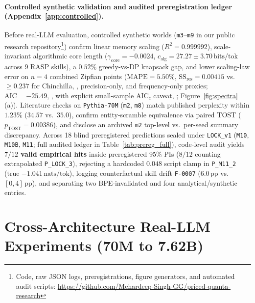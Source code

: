 \documentclass[10pt]{article} %
\begin{document}
\paragraph{Controlled synthetic validation and audited preregistration ledger (Appendix~\ref{app:controlled}).}
Before real-LLM evaluation, controlled synthetic worlds (\texttt{m3}--\texttt{m9} in our public research repository\footnote{Code, raw JSON logs, preregistrations, figure generators, and automated audit scripts: \url{https://github.com/Mehardeep-Singh-GG/priced-quanta-research}}) confirm linear memory scaling ($R^2 = 0.999992$), scale-invariant algorithmic core length ($\gamma_{\text{core}} = -0.0024$, $c_{\text{alg}} = 27.27 \pm 3.70\,\text{bits/tok}$ across 9 RASP skills), a $0.52\%$ greedy-vs-DP knapsack gap, and lower scaling-law error on $n=4$ combined Zipfian points ($\text{MAPE}=5.50\%$, $\text{SS}_{\text{res}} = 0.00415$ vs.\ $\ge 0.237$ for Chinchilla, \citealp{hoffmann2022chinchilla}, precision-only, and frequency-only proxies; $\text{AIC}=-25.49$, \citealp{akaike1974aic}, with explicit small-sample $\mathrm{AIC}_c$ caveat, \citealp{burnham2002aic}; Figure~\ref{fig:spectra}(a)). Literature checks on \texttt{Pythia-70M} (\texttt{m2}, \texttt{m8}) match published perplexity within $1.23\%$ ($34.57$ vs.\ $35.0$), confirm entity-scramble equivalence via paired TOST \citep{lakens2017tost} ($p_{\text{TOST}}=0.00386$), and disclose an archived \texttt{m2} top-level vs.\ per-seed summary discrepancy. Across 18 blind preregistered predictions sealed under \texttt{LOCK\_v1} (\texttt{M10}, \texttt{M10B}, \texttt{M11}; full audited ledger in Table~\ref{tab:prereg_full}), code-level audit yields \textbf{$7/12$ valid empirical hits} inside preregistered 95\% PIs ($8/12$ counting extrapolated \texttt{P\_LOCK\_3}), rejecting a hardcoded $0.048$ script clamp in \texttt{P\_M11\_2} (true $-1.041\,\text{nats/tok}$), logging counterfactual skill drift \texttt{F-0007} ($6.0\,\text{pp}$ vs.\ $[0,4]\,\text{pp}$), and separating two BPE-invalidated and four analytical/synthetic entries.

\section{Cross-Architecture Real-LLM Experiments (70M to 7.62B)}
\label{sec:real_llms}
\end{document}
